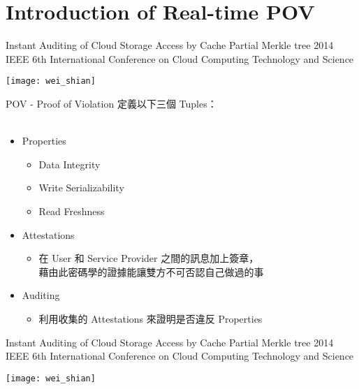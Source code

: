\section{Introduction of Real-time POV}

\begin{frame}{\normalsize{Instant Auditing of Cloud Storage Access by Cache Partial Merkle tree}}
{\tiny{2014 IEEE 6th International Conference on Cloud Computing Technology and Science}}
	\begin{center}
		\texttt{[image: wei\_shian]}
	\end{center}
\end{frame}

\begin{frame}{POV - Proof of Violation}
	定義以下三個 Tuples：
    ~\\
    ~\\
	\begin{itemize}  
        \item Properties
	        \begin{itemize}
            	\item Data Integrity
                \item Write Serializability
                \item Read Freshness
            \end{itemize}
        \item Attestations
	        \begin{itemize}
            	\item 在 User 和 Service Provider 之間的訊息加上簽章，\\ 藉由此密碼學的證據能讓雙方不可否認自己做過的事
            \end{itemize}
        \item Auditing
            \begin{itemize}
            	\item 利用收集的 Attestations 來證明是否違反 Properties
            \end{itemize}
    \end{itemize}
\end{frame}

\begin{frame}{\normalsize{Instant Auditing of Cloud Storage Access by Cache Partial Merkle tree}}
{\tiny{2014 IEEE 6th International Conference on Cloud Computing Technology and Science}}
	\begin{center}
		\texttt{[image: wei\_shian]}
	\end{center}
\end{frame}

